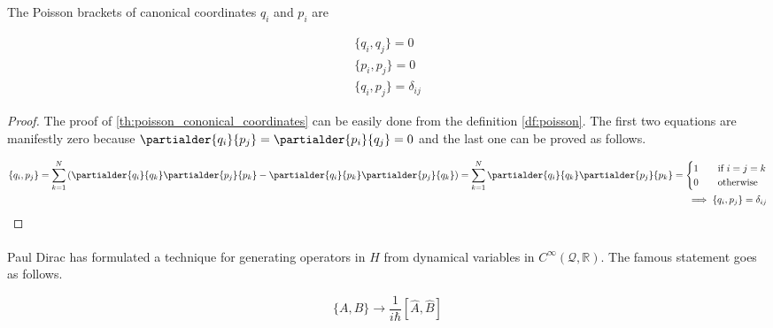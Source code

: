 \begin{theorem}
    \label{th:poisson_cononical_coordinates}
    The Poisson brackets of canonical coordinates $q_{i}$ and $p_{i}$ are

    \begin{equation}
        \begin{gathered}
        \{q_{i}, q_{j}\} = 0 \\
        \{p_{i}, p_{j}\} = 0 \\
        \{q_{i}, p_{j}\} = \delta_{ij}
        \end{gathered}
    \end{equation}
\end{theorem}

\begin{proof}
    The proof of \ref{th:poisson_cononical_coordinates} can be easily done from the definition \ref{df:poisson}. 
    The first two equations are manifestly zero because $\partialder{q_{i}}{p_{j}} = \partialder{p_{i}}{q_{j}} = 0$
    and the last one can be proved as follows.

    \begin{equation}
        \begin{split}
            \{q_{i}, p_{j}\} = \sum_{k=1}^{N}\left(\partialder{q_{i}}{q_{k}} \partialder{p_{j}}{p_{k}} - \partialder{q_{i}}{p_{k}} \partialder{p_{j}}{q_{k}}\right) 
            = \sum_{k=1}^{N} \partialder{q_{i}}{q_{k}} \partialder{p_{j}}{p_{k}} = 
            \begin{cases}
                1  & \quad \text{if } i = j = k \\
                0  & \quad \text{otherwise}
            \end{cases} \\
            \implies \{q_{i}, p_{j}\} = \delta_{ij}
        \end{split}
    \end{equation}
\end{proof}

\paragraph{} Paul Dirac has formulated a technique for generating operators in $H$ from dynamical variables in $C^{\infty}(\mathcal{Q}, \mathbb{R})$. 
The famous statement goes as follows.

\begin{equation}
    \label{eq:dirac_quantization}
    \{A, B\} \to \frac{1}{i \hbar}[\hat{A}, \hat{B}]
\end{equation}

